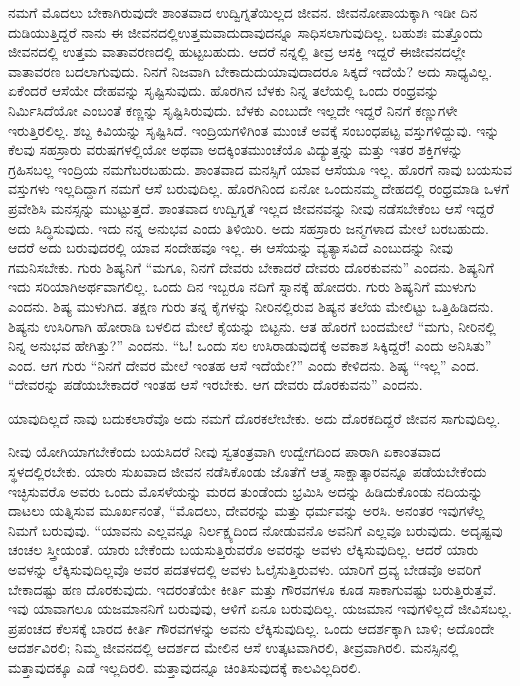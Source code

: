 ನಮಗೆ ಮೊದಲು ಬೇಕಾಗಿರುವುದೇ ಶಾಂತವಾದ ಉದ್ವಿಗ್ನತೆಯಿಲ್ಲದ ಜೀವನ. ಜೀವನೋಪಾಯಕ್ಕಾಗಿ ಇಡೀ ದಿನ ದುಡಿಯುತ್ತಿದ್ದರೆ ನಾನು ಈ ಜೀವನದಲ್ಲಿ\break ಉತ್ತಮವಾದುದಾವುದನ್ನೂ ಸಾಧಿಸಲಾಗುವುದಿಲ್ಲ. ಬಹುಶಃ ಮತ್ತೊಂದು ಜೀವನದಲ್ಲಿ ಉತ್ತಮ ವಾತಾವರಣದಲ್ಲಿ ಹುಟ್ಟಬಹುದು. ಆದರೆ ನನ್ನಲ್ಲಿ ತೀವ್ರ ಆಸಕ್ತಿ ಇದ್ದರೆ ಈ\break ಜೀವನದಲ್ಲೇ ವಾತಾವರಣ ಬದಲಾಗುವುದು. ನಿನಗೆ ನಿಜವಾಗಿ ಬೇಕಾದುದು\break ಯಾವುದಾದರೂ ಸಿಕ್ಕದೆ ಇದೆಯೆ? ಅದು ಸಾಧ್ಯವಿಲ್ಲ. ಏಕೆಂದರೆ ಆಸೆಯೇ ದೇಹವನ್ನು ಸೃಷ್ಟಿಸುವುದು. ಹೊರಗಿನ ಬೆಳಕು ನಿನ್ನ ತಲೆಯಲ್ಲಿ ಒಂದು ರಂಧ್ರವನ್ನು ನಿರ್ಮಿಸಿದೆಯೋ ಎಂಬಂತೆ ಕಣ್ಣನ್ನು ಸೃಷ್ಟಿಸಿರುವುದು. ಬೆಳಕು ಎಂಬುದೇ ಇಲ್ಲದೇ ಇದ್ದರೆ ನಿನಗೆ ಕಣ್ಣುಗಳೇ ಇರುತ್ತಿರಲಿಲ್ಲ. ಶಬ್ದ ಕಿವಿಯನ್ನು ಸೃಷ್ಟಿಸಿದೆ. ಇಂದ್ರಿಯಗಳಿಗಿಂತ ಮುಂಚೆ ಅವಕ್ಕೆ ಸಂಬಂಧಪಟ್ಟ ವಸ್ತುಗಳಿದ್ದುವು. ಇನ್ನು ಕೆಲವು ಸಹಸ್ರಾರು ವರುಷಗಳಲ್ಲಿಯೋ ಅಥವಾ ಅದಕ್ಕಿಂತ\break ಮುಂಚೆಯೊ ವಿದ್ಯುತ್ತನ್ನು ಮತ್ತು ಇತರ ಶಕ್ತಿಗಳನ್ನು ಗ್ರಹಿಸಬಲ್ಲ ಇಂದ್ರಿಯ ನಮಗೆ\break ಬರಬಹುದು. ಶಾಂತವಾದ ಮನಸ್ಸಿಗೆ ಯಾವ ಆಸೆಯೂ ಇಲ್ಲ. ಹೊರಗೆ ನಾವು ಬಯಸುವ ವಸ್ತುಗಳು ಇಲ್ಲದಿದ್ದಾಗ ನಮಗೆ ಆಸೆ ಬರುವುದಿಲ್ಲ. ಹೊರಗಿನಿಂದ ಏನೋ ಒಂದು\break ನಮ್ಮ ದೇಹದಲ್ಲಿ ರಂಧ್ರಮಾಡಿ ಒಳಗೆ ಪ್ರವೇಶಿಸಿ ಮನಸ್ಸನ್ನು ಮುಟ್ಟುತ್ತದೆ. ಶಾಂತವಾದ ಉದ್ವಿಗ್ನತೆ ಇಲ್ಲದ ಜೀವನವನ್ನು ನೀವು ನಡೆಸಬೇಕೆಂಬ ಆಸೆ ಇದ್ದರೆ ಅದು ಸಿದ್ಧಿಸುವುದು. ಇದು ನನ್ನ ಅನುಭವ ಎಂದು ತಿಳಿಯಿರಿ. ಅದು ಸಹಸ್ರಾರು ಜನ್ಮಗಳಾದ ಮೇಲೆ ಬರಬಹುದು. ಆದರೆ ಅದು ಬರುವುದರಲ್ಲಿ ಯಾವ ಸಂದೇಹವೂ ಇಲ್ಲ. ಈ ಆಸೆಯನ್ನು ವ್ಯತ್ಯಾಸವಿದೆ ಎಂಬುದನ್ನು ನೀವು ಗಮನಿಸಬೇಕು. ಗುರು ಶಿಷ್ಯನಿಗೆ “ಮಗೂ, ನಿನಗೆ ದೇವರು ಬೇಕಾದರೆ ದೇವರು ದೊರಕುವನು” ಎಂದನು. ಶಿಷ್ಯನಿಗೆ ಇದು ಸರಿಯಾಗಿ\break ಅರ್ಥವಾಗಲಿಲ್ಲ. ಒಂದು ದಿನ ಇಬ್ಬರೂ ನದಿಗೆ ಸ್ನಾನಕ್ಕೆ ಹೋದರು. ಗುರು ಶಿಷ್ಯನಿಗೆ ಮುಳುಗು ಎಂದನು. ಶಿಷ್ಯ ಮುಳುಗಿದ. ತಕ್ಷಣ ಗುರು ತನ್ನ ಕೈಗಳನ್ನು ನೀರಿನಲ್ಲಿರುವ ಶಿಷ್ಯನ ತಲೆಯ ಮೇಲಿಟ್ಟು ಒತ್ತಿಹಿಡಿದನು. ಶಿಷ್ಯನು ಉಸಿರಿಗಾಗಿ ಹೋರಾಡಿ ಬಳಲಿದ ಮೇಲೆ ಕೈಯನ್ನು ಬಿಟ್ಟನು. ಆತ ಹೊರಗೆ ಬಂದಮೇಲೆ “ಮಗು, ನೀರಿನಲ್ಲಿ ನಿನ್ನ ಅನುಭವ ಹೇಗಿತ್ತು?” ಎಂದನು. “ಓ! ಒಂದು ಸಲ ಉಸಿರಾಡುವುದಕ್ಕೆ ಅವಕಾಶ ಸಿಕ್ಕಿದ್ದರೆ! ಎಂದು ಅನಿಸಿತು” ಎಂದ. ಆಗ ಗುರು “ನಿನಗೆ ದೇವರ ಮೇಲೆ ಇಂತಹ ಆಸೆ ಇದೆಯೇ?” ಎಂದು ಕೇಳಿದನು. ಶಿಷ್ಯ “ಇಲ್ಲ” ಎಂದ. “ದೇವರನ್ನು ಪಡೆಯಬೇಕಾದರೆ ಇಂತಹ ಆಸೆ ಇರಬೇಕು. ಆಗ ದೇವರು ದೊರಕುವನು” ಎಂದನು.

ಯಾವುದಿಲ್ಲದೆ ನಾವು ಬದುಕಲಾರೆವೊ ಅದು ನಮಗೆ ದೊರಕಲೇಬೇಕು. ಅದು ದೊರಕದಿದ್ದರೆ ಜೀವನ ಸಾಗುವುದಿಲ್ಲ.

\vskip 0.1cm

ನೀವು ಯೋಗಿಯಾಗಬೇಕೆಂದು ಬಯಸಿದರೆ ನೀವು ಸ್ವತಂತ್ರವಾಗಿ ಉದ್ವೇಗದಿಂದ ಪಾರಾಗಿ ಏಕಾಂತವಾದ ಸ್ಥಳದಲ್ಲಿರಬೇಕು. ಯಾರು ಸುಖವಾದ ಜೀವನ ನಡೆಸಿಕೊಂಡು ಜೊತೆಗೆ ಆತ್ಮ ಸಾಕ್ಷಾತ್ಕಾರವನ್ನೂ ಪಡೆಯಬೇಕೆಂದು ಇಚ್ಛಿಸುವರೊ ಅವರು ಒಂದು ಮೊಸಳೆಯನ್ನು ಮರದ ತುಂಡೆಂದು ಭ್ರಮಿಸಿ ಅದನ್ನು ಹಿಡಿದುಕೊಂಡು ನದಿಯನ್ನು ದಾಟಲು ಯತ್ನಿಸುವ ಮೂರ್ಖನಂತೆ, “ಮೊದಲು, ದೇವರನ್ನು ಮತ್ತು ಧರ್ಮವನ್ನು ಅರಸಿ. ಅನಂತರ ಇವುಗಳೆಲ್ಲ ನಿಮಗೆ ಬರುವುವು. “ಯಾವನು ಎಲ್ಲವನ್ನೂ ನಿರ್ಲಕ್ಷ್ಯದಿಂದ ನೋಡುವನೊ ಅವನಿಗೆ ಎಲ್ಲವೂ ಬರುವುದು. ಅದೃಷ್ಟವು ಚಂಚಲ ಸ್ತ್ರೀಯಂತೆ. ಯಾರು ಬೇಕೆಂದು ಬಯಸುತ್ತಿರುವರೊ ಅವರನ್ನು ಅವಳು ಲೆಕ್ಕಿಸುವುದಿಲ್ಲ. ಆದರೆ ಯಾರು ಅವಳನ್ನು ಲೆಕ್ಕಿಸುವುದಿಲ್ಲವೊ ಅವರ ಪದತಳದಲ್ಲಿ ಅವಳು ಓಲೈಸುತ್ತಿರುವಳು. ಯಾರಿಗೆ ದ್ರವ್ಯ ಬೇಡವೊ ಅವರಿಗೆ ಬೇಕಾದಷ್ಟು ಹಣ ದೊರಕುವುದು. ಇದರಂತೆಯೇ ಕೀರ್ತಿ ಮತ್ತು ಗೌರವಗಳೂ ಕೂಡ ಸಾಕಾಗುವಷ್ಟು ಬರುತ್ತಿರುತ್ತವೆ. ಇವು ಯಾವಾಗಲೂ ಯಜಮಾನನಿಗೆ ಬರುವುವು, ಆಳಿಗೆ ಏನೂ ಬರುವುದಿಲ್ಲ. ಯಜಮಾನ ಇವುಗಳಿಲ್ಲದೆ ಜೀವಿಸಬಲ್ಲ. ಪ್ರಪಂಚದ ಕೆಲಸಕ್ಕೆ ಬಾರದ ಕೀರ್ತಿ ಗೌರವಗಳನ್ನು ಅವನು ಲೆಕ್ಕಿಸುವುದಿಲ್ಲ. ಒಂದು ಆದರ್ಶಕ್ಕಾಗಿ ಬಾಳಿ; ಅದೊಂದೇ ಆದರ್ಶವಿರಲಿ; ನಿಮ್ಮ ಜೀವನದಲ್ಲಿ ಆದರ್ಶದ ಮೇಲಿನ ಆಸೆ ಉತ್ಕಟವಾಗಿರಲಿ, ತೀವ್ರವಾಗಿರಲಿ. ಮನಸ್ಸಿನಲ್ಲಿ ಮತ್ತಾವುದಕ್ಕೂ ಎಡೆ ಇಲ್ಲದಿರಲಿ. ಮತ್ತಾವುದನ್ನೂ ಚಿಂತಿಸುವುದಕ್ಕೆ ಕಾಲವಿಲ್ಲದಿರಲಿ.

